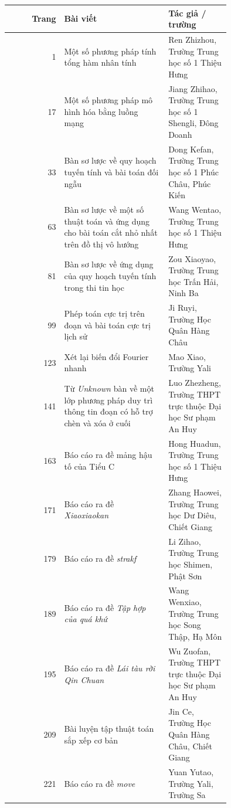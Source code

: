 \documentclass[11pt]{article}
\begin{document}
\begin{center}
\small
\begin{tabular}{r >{\raggedright\arraybackslash}p{0.47\linewidth} >{\raggedright\arraybackslash}p{0.28\linewidth}}
\textbf{Trang} & \textbf{Bài viết} & \textbf{Tác giả / trường} \\
\hline
1 & Một số phương pháp tính tổng hàm nhân tính & Ren Zhizhou, Trường Trung học số 1 Thiệu Hưng \\
17 & Một số phương pháp mô hình hóa bằng luồng mạng & Jiang Zhihao, Trường Trung học số 1 Shengli, Đông Doanh \\
33 & Bàn sơ lược về quy hoạch tuyến tính và bài toán đối ngẫu & Dong Kefan, Trường Trung học số 1 Phúc Châu, Phúc Kiến \\
63 & Bàn sơ lược về một số thuật toán và ứng dụng cho bài toán cắt nhỏ nhất trên đồ thị vô hướng & Wang Wentao, Trường Trung học số 1 Thiệu Hưng \\
81 & Bàn sơ lược về ứng dụng của quy hoạch tuyến tính trong thi tin học & Zou Xiaoyao, Trường Trung học Trấn Hải, Ninh Ba \\
99 & Phép toán cực trị trên đoạn và bài toán cực trị lịch sử & Ji Ruyi, Trường Học Quân Hàng Châu \\
123 & Xét lại biến đổi Fourier nhanh & Mao Xiao, Trường Yali \\
141 & Từ \emph{Unknown} bàn về một lớp phương pháp duy trì thông tin đoạn có hỗ trợ chèn và xóa ở cuối & Luo Zhezheng, Trường THPT trực thuộc Đại học Sư phạm An Huy \\
163 & Báo cáo ra đề mảng hậu tố của Tiểu C & Hong Huadun, Trường Trung học số 1 Thiệu Hưng \\
171 & Báo cáo ra đề \emph{Xiaoxiaokan} & Zhang Haowei, Trường Trung học Dư Diêu, Chiết Giang \\
179 & Báo cáo ra đề \emph{strakf} & Li Zihao, Trường Trung học Shimen, Phật Sơn \\
189 & Báo cáo ra đề \emph{Tập hợp của quá khứ} & Wang Wenxiao, Trường Trung học Song Thập, Hạ Môn \\
195 & Báo cáo ra đề \emph{Lái tàu rời Qin Chuan} & Wu Zuofan, Trường THPT trực thuộc Đại học Sư phạm An Huy \\
209 & Bài luyện tập thuật toán sắp xếp cơ bản & Jin Ce, Trường Học Quân Hàng Châu, Chiết Giang \\
221 & Báo cáo ra đề \emph{move} & Yuan Yutao, Trường Yali, Trường Sa
\end{tabular}
\end{center}
\end{document}
